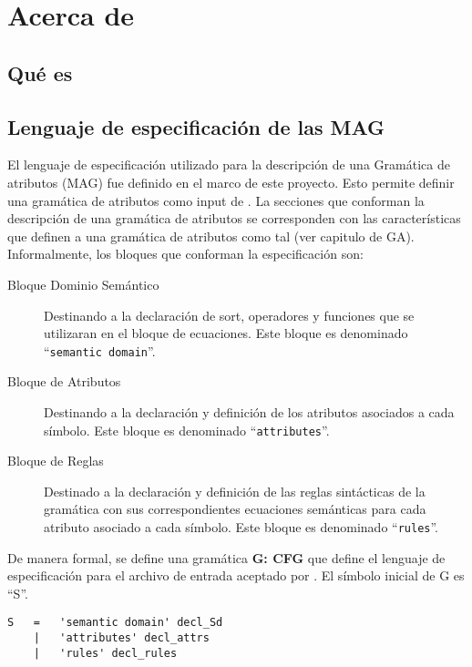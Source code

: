 \chapter{Acerca de \maggen}
\label{chap:disen_}
\minitoc


\section{Qu\'e es \maggen}

\section{Lenguaje de especificaci\'on de las MAG}

El lenguaje de especificación utilizado para la descripción de una Gramática de atributos (MAG) fue definido en el marco de este proyecto. Esto permite definir una gramática de atributos como input de \maggen. 
La secciones que conforman la descripción de una gramática de atributos se corresponden con las características que definen a una gramática de atributos como tal (ver capitulo de GA). 
Informalmente, los bloques que conforman la especificación son:
\begin{description}
\item [Bloque Dominio Semántico] Destinando a la declaración de sort, operadores y funciones que se utilizaran en el bloque de ecuaciones. Este bloque es denominado ``\texttt{semantic domain}''.
\item [Bloque de Atributos] Destinando a la declaración y definición de los atributos asociados a cada símbolo. Este bloque es denominado ``\texttt{attributes}''.
\item [Bloque de Reglas] Destinado a la declaración y definición de las reglas sintácticas de la gramática con sus correspondientes ecuaciones semánticas para cada atributo asociado a cada símbolo. Este bloque es denominado ``\texttt{rules}''.
\end{description}
De manera formal, se define una gramática \textbf{G: CFG} que define el lenguaje de especificación para el archivo de entrada aceptado por \maggen. El símbolo inicial de G es ``S''.
\begin{center}
\lstset{language=inform}
\scriptsize
\begin{lstlisting}[frame=single]
S   =   'semantic domain' decl_Sd
    |   'attributes' decl_attrs
    |   'rules' decl_rules
\end{lstlisting}
\end{center}

